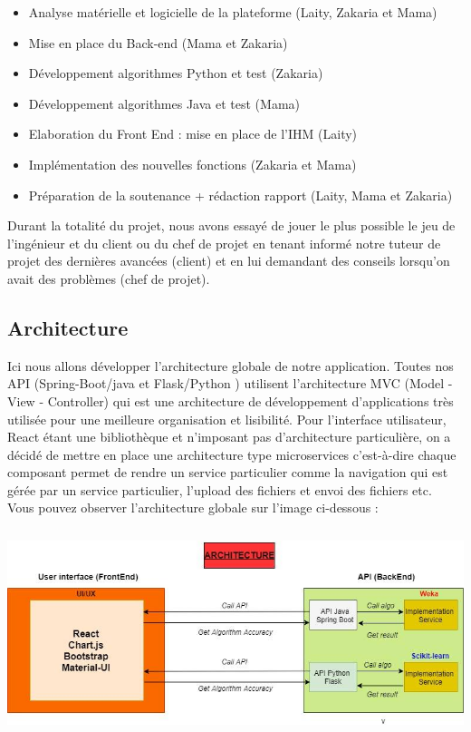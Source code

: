 \documentclass[a4paper,11pt]{article}
\begin{document}
\begin{itemize}
    \item Analyse matérielle et logicielle de la plateforme	  (Laity, Zakaria et Mama)

    \item Mise en place du Back-end					(Mama et Zakaria)

    \item Développement algorithmes Python et test  	 	(Zakaria)

    \item Développement algorithmes Java et test  			(Mama)

    \item Elaboration du Front End : mise en place de l’IHM	(Laity)

    \item Implémentation des nouvelles fonctions			(Zakaria et Mama)

    \item Préparation de la soutenance + rédaction rapport	 (Laity, Mama et Zakaria)

\end{itemize}

Durant la totalité du projet, nous avons essayé de jouer le plus possible le jeu de l’ingénieur et du client ou du chef de projet en tenant informé notre tuteur de projet des dernières avancées (client) et en lui demandant des conseils lorsqu’on avait des problèmes (chef de projet).

\subsection{Architecture}
Ici nous  allons développer l’architecture globale de notre application.
Toutes nos API (Spring-Boot/java et Flask/Python ) utilisent l’architecture MVC (Model - View - Controller)
qui est une architecture de développement d’applications très utilisée pour une meilleure organisation et lisibilité.
Pour l’interface utilisateur, React étant une bibliothèque et n’imposant pas d’architecture particulière,
on a décidé de mettre en place une architecture type microservices c’est-à-dire chaque composant permet de
rendre un service particulier comme la navigation qui est gérée par un service particulier,
l’upload des fichiers et envoi des fichiers etc.\\
Vous pouvez observer l’architecture globale sur l’image ci-dessous :

\includegraphics[width=14cm, height=6cm]{archi.jpg}\\
\end{document}

